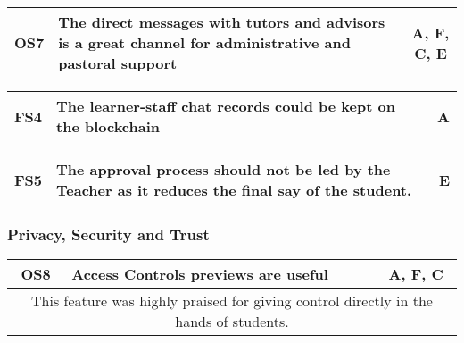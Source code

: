 \begin{table}[!ht]
	\begin{tabularx}{\textwidth}{|c|X|c|}
		\hline
		OS7 & \textbf{The direct messages with tutors and advisors is a great channel for administrative and pastoral support} & A, F, C, E                 \\
		\hline
	\end{tabularx}
\end{table}

\begin{table}[!ht]
	\begin{tabularx}{\textwidth}{|c|X|c|}
		\hline
		FS4 & \textbf{The learner-staff chat records could be kept on the blockchain} & A\\
		\hline
	\end{tabularx}
\end{table}

\begin{table}[!ht]
	\begin{tabularx}{\textwidth}{|c|X|c|}
		\hline
		FS5 & \textbf{The approval process should not be led by the Teacher as it reduces the final say of the student.} & E\\
		\hline
	\end{tabularx}
\end{table}

\subsubsection{Privacy, Security and Trust}

\begin{table}[!ht]
	\begin{tabularx}{\textwidth}{|c|X|c|}
		\hline
		OS8 & \textbf{Access Controls previews are useful} & A, F, C                 \\
		\hline
		\multicolumn{3}{|X|}{
			This feature was highly praised for giving control directly in the hands of students.
		} \\
		\hline
	\end{tabularx}
\end{table}

